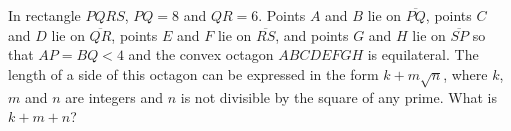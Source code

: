In rectangle $PQRS$, $PQ=8$ and $QR=6$. Points $A$ and $B$ lie on $\overline{PQ}$, points $C$ and $D$ lie on $\overline{QR}$, points $E$ and $F$ lie on $\overline{RS}$, and points $G$ and $H$ lie on $\overline{SP}$ so that $AP=BQ<4$ and the convex octagon $ABCDEFGH$ is equilateral. The length of a side of this octagon can be expressed in the form $k+m\sqrt n$, where $k$, $m$ and $n$ are integers and $n$ is not divisible by the square of any prime. What is $k+m+n$?
